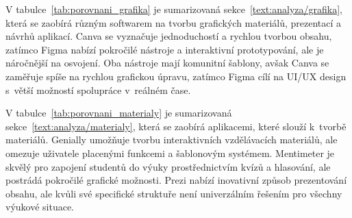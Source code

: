 V tabulce~\ref{tab:porovnani_grafika} je sumarizovaná sekce~\ref{text:analyza/grafika}, která se zaobírá různým softwarem na tvorbu grafických materiálů, prezentací a návrhů aplikací.
Canva se vyznačuje jednoduchostí a rychlou tvorbou obsahu, zatímco Figma nabízí pokročilé nástroje a interaktivní prototypování, ale je náročnější na osvojení. Oba nástroje mají komunitní šablony, avšak Canva se zaměřuje spíše na rychlou grafickou úpravu, zatímco Figma cílí na UI/UX design s~větší možností spolupráce v~reálném čase.


\begin{table}[ht!]
    \centering
    \caption{Porovnání aplikací na grafickou tvorbu}
    \label{tab:porovnani_grafika}
\end{table}

V tabulce~\ref{tab:porovnani_materialy} je sumarizovaná sekce~\ref{text:analyza/materialy}, která se zaobírá aplikacemi, které slouží k~tvorbě materiálů.
Genially umožňuje tvorbu interaktivních vzdělávacích materiálů, ale omezuje uživatele placenými funkcemi a šablonovým systémem.
Mentimeter je skvělý pro zapojení studentů do výuky prostřednictvím kvízů a hlasování, ale postrádá pokročilé grafické možnosti. 
Prezi nabízí inovativní způsob prezentování obsahu, ale kvůli své specifické struktuře není univerzálním řešením pro všechny výukové situace.


